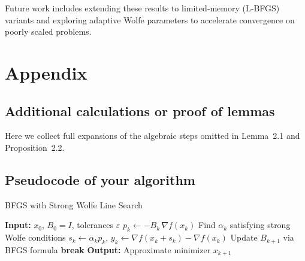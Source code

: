 \documentclass[12pt]{report}
\begin{document}
Future work includes extending these results to limited‐memory (L‐BFGS) variants and exploring adaptive Wolfe parameters to accelerate convergence on poorly scaled problems.

\appendix

\chapter*{Appendix}
\renewcommand{\thesection}{\Alph{section}}

\section{Additional calculations or proof of lemmas}

Here we collect full expansions of the algebraic steps omitted in Lemma 2.1 and Proposition 2.2.
\section{Pseudocode of your algorithm}

\begin{algorithm}[H]
	\caption{BFGS with Strong Wolfe Line Search}
	\begin{algorithmic}[1]
		\State \textbf{Input:} $x_0$, $B_0=I$, tolerances $\varepsilon$
		\State $p_k \gets -B_k\,\nabla f(x_k)$
		\State Find $\alpha_k$ satisfying strong Wolfe conditions
		\State $s_k \gets \alpha_k p_k$, \quad $y_k \gets \nabla f(x_k+s_k)-\nabla f(x_k)$
		\State Update $B_{k+1}$ via BFGS formula
		 \textbf{break} \EndIf
		\EndFor
		\State \textbf{Output:} Approximate minimizer $x_{k+1}$
	\end{algorithmic}
\end{algorithm}


\end{document}
